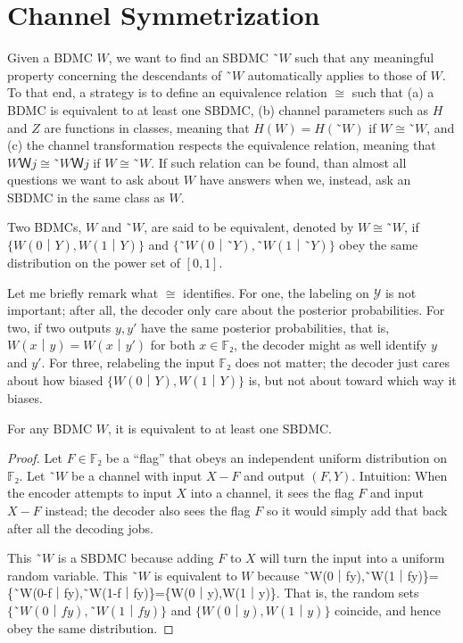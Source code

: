 \documentclass[openany]{amsbook}
\numberwithin{equation}{chapter}
\numberwithin{figure}{chapter}
\numberwithin{table}{chapter}
\def\[#1\]{\begin{equation*}{#1}\end{equation*}}
\theoremstyle{definition}	理dfn:Definition~?s			理exa:Example~?s
\theoremstyle{remark}		理cla:Claim~?s				理rem:Remark~?s
\begin{document}
\section{Channel Symmetrization}

	Given a BDMC $W$, we want to find an SBDMC $˜W$ such that any meaningful property
	concerning the descendants of $˜W$ automatically applies to those of $W$.
	To that end, a strategy is to define an equivalence relation $≅$ such that
	(a)	a BDMC is equivalent to at least one SBDMC,
	(b)	channel parameters such as $H$ and $Z$ are functions in classes,
		meaning that $H(W)=H(˜W)$ if $W≅˜W$, and
	(c)	the channel transformation respects the equivalence relation,
		meaning that $WＷj≅˜WＷj$ if $W≅˜W$.
	If such relation can be found, than almost all questions we want to ask about $W$
	have answers when we, instead, ask an SBDMC in the same class as $W$.
	
	\begin{dfn}
		Two BDMCs, $W$ and $˜W$, are said to be equivalent,
		denoted by $W≅˜W$, if $\{W(0｜Y),W(1｜Y)\}$ and $\{˜W(0｜˜Y),˜W(1｜˜Y)\}$
		obey the same distribution on the power set of $[0,1]$.
	\end{dfn}
	
	Let me briefly remark what $≅$ identifies.
	For one, the labeling on $𝒴$ is not important;
	after all, the decoder only care about the posterior probabilities.
	For two, if two outputs $y,y'$ have the same posterior probabilities, that is,
	$W(x｜y)=W(x｜y')$ for both $x∈𝔽₂$, the decoder might as well identify $y$ and $y'$.
	For three, relabeling the input $𝔽₂$ does not matter;
	the decoder just cares about how biased $\{W(0｜Y),W(1｜Y)\}$ is,
	but not about toward which way it biases.
	
	\begin{lem}
		For any BDMC $W$, it is equivalent to at least one SBDMC.
	\end{lem}
	
	\begin{proof}
		Let $F∈𝔽₂$ be a “flag” that obeys an independent uniform distribution on $𝔽₂$.
		Let $˜W$  be a channel with input $X-F$ and output $(F,Y)$.
		Intuition:
		When the encoder attempts to input $X$ into a channel,
		it sees the flag $F$ and input $X-F$ instead;
		the decoder also sees the flag $F$ so it would
		simply add that back after all the decoding jobs.
		
		This $˜W$ is a SBDMC because adding $F$ to $X$
		will turn the input into a uniform random variable.
		This $˜W$ is equivalent to $W$ because
		\[\{˜W(0｜fy),˜W(1｜fy)\}=\{˜W(0-f｜fy),˜W(1-f｜fy)\}=\{W(0｜y),W(1｜y)\}.\]
		That is, the random sets $\{˜W(0｜fy),˜W(1｜fy)\}$ and $\{W(0｜y),W(1｜y)\}$
		coincide, and hence obey the same distribution.
	\end{proof}
	
\end{document}
